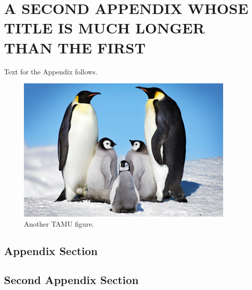 %
%
%
%


\chapter{\uppercase {A Second Appendix Whose Title Is Much Longer Than The First}}

Text for the Appendix follows.

\begin{figure}[H]
\centering
\includegraphics[scale=.50]{figures/Penguins.jpg}
\caption{Another TAMU figure.}
\label{fig:tamu-fig6}
\end{figure}

\section{Appendix Section}

\section{Second Appendix Section}


\pagebreak{}